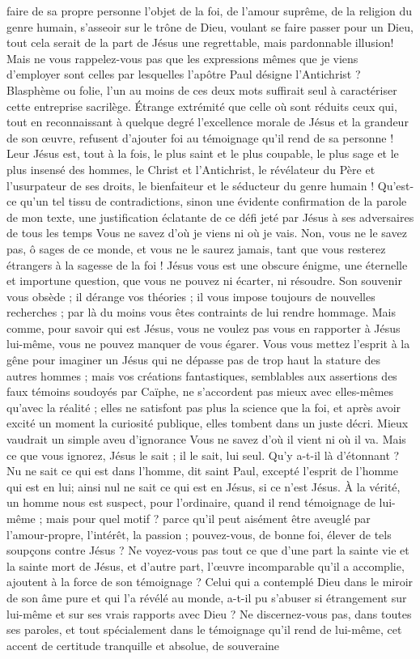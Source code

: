 faire de sa propre personne l’objet de la foi, de l’amour suprême, de la religion du genre humain,
s’asseoir sur le trône de Dieu, voulant se faire passer pour un Dieu,
tout cela serait de la part de Jésus une regrettable, mais pardonnable illusion!
Mais ne vous rappelez-vous pas que les expressions mêmes que je viens d’employer sont celles par lesquelles l’apôtre Paul désigne l’Antichrist ? Blasphème ou folie, l’un au moins de ces deux mots suffirait seul à caractériser cette entreprise sacrilège. Étrange extrémité que celle où sont réduits ceux qui, tout en reconnaissant à quelque degré l’excellence morale de Jésus et la grandeur de son œuvre, refusent d’ajouter foi au témoignage qu’il rend de sa personne ! Leur Jésus est, tout à la fois, le plus saint et le plus coupable, le plus sage et le plus insensé des hommes, le Christ et l’Antichrist, le révélateur du Père et l’usurpateur de ses droits, le bienfaiteur et le séducteur du genre humain ! Qu’est-ce qu’un tel tissu de contradictions, sinon une évidente confirmation de la parole de mon texte, une justification éclatante de ce défi jeté par Jésus à ses adversaires de tous les temps\frcolon{} \Og{} Vous ne savez d’où je viens ni où je vais.\Fg{} Non, vous ne le savez pas, ô sages de ce monde, et vous ne le saurez jamais, tant que vous resterez étrangers à la sagesse de la foi ! Jésus vous est une obscure énigme, une éternelle et importune question, que vous ne pouvez ni écarter, ni résoudre. Son souvenir vous obsède ; il dérange vos théories ; il vous impose toujours de nouvelles recherches ; par là du moins vous êtes contraints de lui rendre hommage. Mais comme, pour savoir qui est Jésus, vous ne voulez pas vous en rapporter à Jésus lui-même, vous ne pouvez manquer de vous égarer. Vous vous mettez l’esprit à la gêne pour imaginer un Jésus qui ne dépasse pas de trop haut la stature des autres hommes ; mais vos créations fantastiques, semblables aux assertions des faux témoins soudoyés par Caïphe, ne s’accordent pas mieux avec elles-mêmes qu’avec la réalité ; elles ne satisfont pas plus la science que la foi, et après avoir excité un moment la curiosité publique, elles tombent dans un juste décri. Mieux vaudrait un simple aveu d’ignorance\frcolon{} Vous ne savez d’où il vient ni où il va. Mais ce que vous ignorez, Jésus le sait ; il le sait, lui seul. Qu’y a-t-il là d’étonnant ? \Og{} Nu ne sait ce qui est dans l’homme, dit saint Paul, excepté l’esprit de l’homme qui est en lui\Fg{}; ainsi nul ne sait ce qui est en Jésus, si ce n’est Jésus. À la vérité, un homme nous est suspect, pour l’ordinaire, quand il rend témoignage de lui-même ; mais pour quel motif ? parce qu’il peut aisément être aveuglé par l’amour-propre, l’intérêt, la passion ; pouvez-vous, de bonne foi, élever de tels soupçons contre Jésus ? Ne voyez-vous pas tout ce que d’une part la sainte vie et la sainte mort de Jésus, et d’autre part, l’œuvre incomparable qu’il a accomplie, ajoutent à la force de son témoignage ? Celui qui a contemplé Dieu dans le miroir de son âme pure et qui l’a révélé au monde, a-t-il pu s’abuser si étrangement sur lui-même et sur ses vrais rapports avec Dieu ? Ne discernez-vous pas, dans toutes ses paroles, et tout spécialement dans le témoignage qu’il rend de lui-même, cet accent de certitude tranquille et absolue, de souveraine 